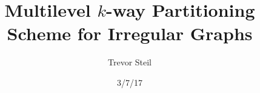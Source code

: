 \documentclass{beamer}
\title{Multilevel $k$-way Partitioning Scheme for Irregular Graphs}
\date{3/7/17}
\author{Trevor Steil}
\begin{document}
\begin{frame}
  \titlepage
\end{frame}
\end{document}
